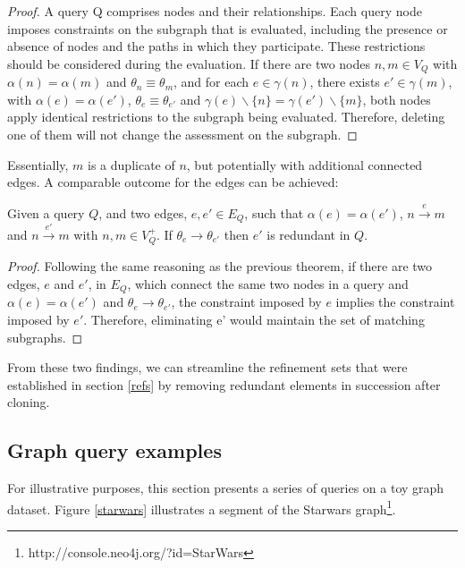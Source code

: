 \documentclass{article}%
\begin{document}
\begin{proof}{}

A query Q comprises nodes and their relationships. Each query node imposes constraints on the subgraph that is evaluated, including the presence or absence of nodes and the paths in which they participate. These restrictions should be considered during the evaluation. If there are two nodes $n,m \in V_Q$ with $\alpha(n) = \alpha(m)$ and $\theta_n\equiv\theta_m$, and for each $e\in \gamma(n)$, there exists $e'\in \gamma(m)$, with $\alpha(e)=\alpha(e')$, $\theta_e\equiv\theta_{e'}$ and $\gamma(e)\smallsetminus\{n\}=\gamma(e')\smallsetminus\{m\}$, both nodes apply identical restrictions to the subgraph being evaluated. Therefore, deleting one of them will not change the assessment on the subgraph.
\end{proof}


Essentially, $m$ is a duplicate of $n$, but potentially with additional connected edges. A comparable outcome for the edges can be achieved:

\begin{theorem}{}
    Given a query $Q$, and two edges, $e, e'\in E_Q$, such that $\alpha(e)=\alpha(e')$, $n\stackrel {e}{\longrightarrow} m$ and $n\stackrel {e'}{\longrightarrow} m$ with $n,m \in V_Q^+$. If $\theta_e\rightarrow \theta_{e'}$ then $e'$ is redundant in $Q$.
\end{theorem}


\begin{proof}{}

Following the same reasoning as the previous theorem, if there are two edges, $e$ and $e'$, in $E_Q$, which connect the same two nodes in a query and $\alpha(e)=\alpha(e')$ and $\theta_e\rightarrow \theta_{e'}$, the constraint imposed by $e$ implies the constraint imposed by $e'$. Therefore, eliminating e' would maintain the set of matching subgraphs.

\end{proof}

From these two findings, we can streamline the refinement sets that were established in section \ref{refs} by removing redundant elements in succession after cloning. 

\subsection{Graph query examples}

For illustrative purposes, this section presents a series of queries on a toy graph dataset. Figure \ref{starwars} illustrates a segment of the Starwars graph\footnote{http://console.neo4j.org/?id=StarWars}.
\end{document}
